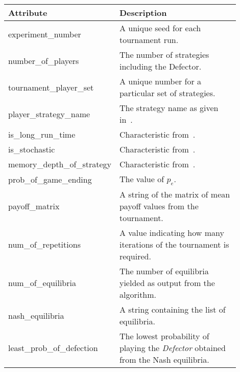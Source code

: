\begin{table}
\centering
\begin{tabular}{>{\raggedright}p{0.3\linewidth}>{\raggedright\arraybackslash}p{0.6\linewidth}}
    \toprule
    \textbf{Attribute}                   & \textbf{Description} \\
    \midrule
    experiment\_number           & A unique seed for each tournament run. \\
       
    number\_of\_players           & The number of strategies including the
    Defector. \\
             
    tournament\_player\_set       & A unique number for a particular set of
    strategies. \\
        
    player\_strategy\_name        & The strategy name as given
    in~\cite{axelrodproject}. \\
      
    is\_long\_run\_time            & Characteristic from~\cite{axelrodproject}.
    \\
          
    is\_stochastic               & Characteristic from~\cite{axelrodproject}. \\ 
       
    memory\_depth\_of\_strategy    & Characteristic from~\cite{axelrodproject}.
    \\
       
    prob\_of\_game\_ending         & The value of \(p_{e}\). \\
         
    payoff\_matrix               & A string of the matrix of mean payoff values
    from the tournament. \\
    
    num\_of\_repetitions          & A value indicating how many iterations of
    the tournament is required. \\  
          
    num\_of\_equilibria           & The number of equilibria yielded as output
    from the algorithm. \\
        
    nash\_equilibria             & A string containing the list of equilibria. \\
    
    least\_prob\_of\_defection     & The lowest probability of playing the
    \textit{Defector} obtained from the Nash equilibria. \\ 
     

\end{tabular}
\end{table}
